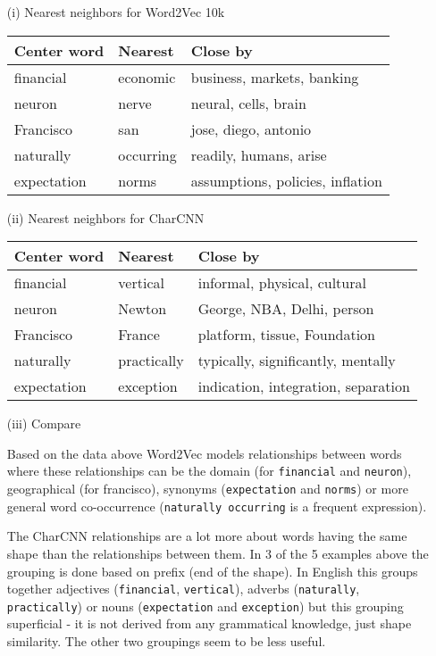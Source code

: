 \documentclass{article}
\begin{document}
\begin{enumerate}
\begin{itemize}
\item[(i)]{Nearest neighbors for Word2Vec 10k}

\begin{center}
\begin{tabular}{l|l|l}
\toprule
Center word & Nearest & Close by\\
\midrule
financial & economic & business, markets, banking\\
neuron & nerve & neural, cells, brain\\
Francisco & san & jose, diego, antonio\\
naturally & occurring & readily, humans, arise\\
expectation & norms & assumptions, policies, inflation\\
\bottomrule
\end{tabular}
\end{center}


\item[(ii)]{Nearest neighbors for CharCNN}

\begin{center}
\begin{tabular}{l|l|l}
\toprule
Center word & Nearest & Close by\\
\midrule
financial & vertical & informal, physical, cultural\\
neuron & Newton & George, NBA, Delhi, person\\
Francisco & France & platform, tissue, Foundation\\
naturally & practically & typically, significantly, mentally\\
expectation & exception & indication, integration, separation\\

\bottomrule
\end{tabular}
\end{center}

\item[(iii)]{Compare}

Based on the data above Word2Vec models relationships between words where these relationships can be the domain (for \texttt{financial} and \texttt{neuron}), geographical (for francisco), synonyms (\texttt{expectation} and \texttt{norms}) or more general word co-occurrence (\texttt{naturally occurring} is a frequent expression).


The CharCNN relationships are a lot more about words having the same shape than the relationships between them. In 3 of the 5 examples above the grouping is done based on prefix (end of the shape). In English this groups together adjectives (\texttt{financial}, \texttt{vertical}), adverbs (\texttt{naturally}, \texttt{practically}) or nouns (\texttt{expectation} and \texttt{exception}) but this grouping superficial - it is not derived from any grammatical knowledge, just shape similarity. The other two groupings seem to be less useful.



\end{itemize}
\end{enumerate}
\end{document}
